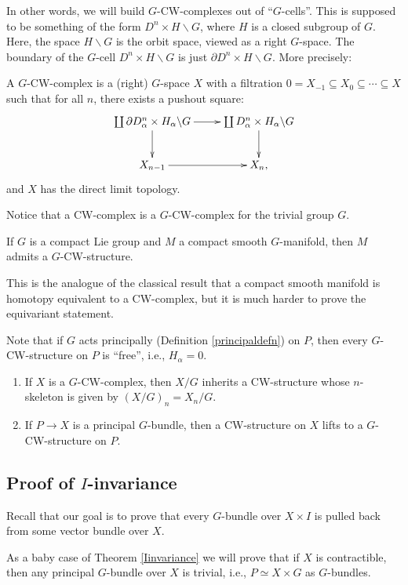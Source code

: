 In other words, we will build $G$-CW-complexes out of ``$G$-cells''. This is
supposed to be something of the form $D^n\times H\backslash G$, where $H$ is a
closed subgroup of $G$. Here, the space $H\backslash G$ is the orbit space,
viewed as a right $G$-space. The boundary of the $G$-cell $D^n\times
H\backslash G$ is just $\partial D^n\times H\backslash G$. More precisely:
\begin{definition}
    A $G$-CW-complex is a (right) $G$-space $X$ with a filtration
    $0=X_{-1}\subseteq X_0\subseteq \cdots\subseteq X$ such that for all $n$,
    there exists a pushout square:
    \begin{equation*}
	\xymatrix{
	    \coprod\partial D^n_\alpha\times H_\alpha\backslash G\ar[r]\ar[d] &
	    \coprod D^n_\alpha\times H_\alpha\backslash G\ar[d]\\
	    X_{n-1}\ar[r] & X_n,
	    }
    \end{equation*}
    and $X$ has the direct limit topology.
\end{definition}
Notice that a CW-complex is a $G$-CW-complex for the trivial group $G$.
\begin{theorem}
    If $G$ is a compact Lie group and $M$ a compact smooth $G$-manifold, then
    $M$ admits a $G$-CW-structure.
\end{theorem}
This is the analogue of the classical result that a compact smooth manifold is
homotopy equivalent to a CW-complex, but it is much harder to prove the
equivariant statement.

Note that if $G$ acts principally (Definition \ref{principaldefn}) on $P$, then
every $G$-CW-structure on $P$ is ``free'', i.e., $H_\alpha = 0$.
\begin{enumerate}
    \item If $X$ is a $G$-CW-complex, then $X/G$ inherits a CW-structure whose
	$n$-skeleton is given by $(X/G)_n = X_n/G$.
    \item If $P\to X$ is a principal $G$-bundle, then a CW-structure on $X$
	lifts to a $G$-CW-structure on $P$.
\end{enumerate}
\subsection{Proof of $I$-invariance}
Recall that our goal is to prove that every $G$-bundle over $X\times I$ is
pulled back from some vector bundle over $X$.

As a baby case of Theorem \ref{Iinvariance} we will prove that if
$X$ is contractible, then any principal $G$-bundle over $X$ is trivial, i.e.,
$P\simeq X\times G$ as $G$-bundles.

